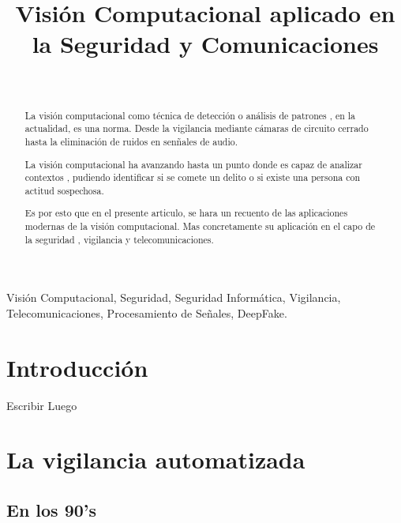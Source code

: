 \documentclass[a4paper]{IEEEtranUNT}
\begin{document}
\title{Visión Computacional aplicado en la Seguridad y Comunicaciones\\
}

\author{\\
}


\maketitle

\begin{abstract}
La visión computacional como técnica de detección o análisis de patrones , en la actualidad, es una norma. Desde la vigilancia mediante
cámaras de circuito cerrado hasta la eliminación de ruidos en sen\~nales de audio.

La visión computacional ha avanzando hasta un punto donde es capaz de analizar contextos , pudiendo identificar si se comete un delito o
si existe una persona con actitud sospechosa.

Es por esto que en el presente articulo, se hara un recuento de las aplicaciones modernas de la visión computacional. Mas concretamente su
aplicación en el capo de la seguridad , vigilancia y telecomunicaciones.

\end{abstract}

\begin{IEEEkeywords}
Visión Computacional, Seguridad, Seguridad Informática, Vigilancia, Telecomunicaciones, Procesamiento de Se\~nales,
DeepFake.
\end{IEEEkeywords}

\section{Introducción}

Escribir Luego

\section{La vigilancia automatizada}

\subsection{En los 90's}
\end{document}
